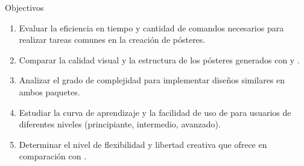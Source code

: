 \begin{alertblock}{Objectivos}
    \begin{enumerate}
        \item Evaluar la eficiencia en tiempo y cantidad de comandos necesarios para realizar tareas comunes en la creación de pósteres.
        \item Comparar la calidad visual y la estructura de los pósteres generados con  y .
        \item Analizar el grado de complejidad para implementar diseños similares en ambos paquetes.
        \item Estudiar la curva de aprendizaje y la facilidad de uso de  para usuarios de diferentes niveles (principiante, intermedio, avanzado).
        \item Determinar el nivel de flexibilidad y libertad creativa que ofrece  en comparación con .
    \end{enumerate}

\end{alertblock}